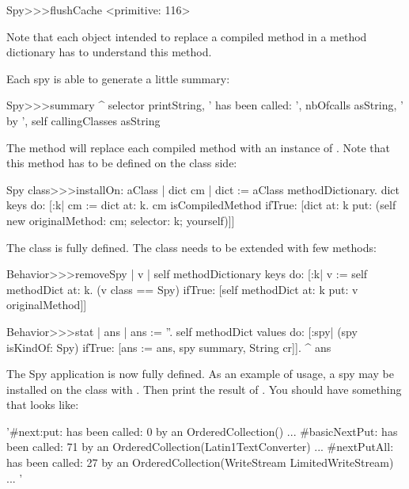 \documentclass[a4paper,10pt,twoside]{book}
\begin{document}
\begin{code}{}
Spy>>>flushCache
	<primitive: 116>
\end{code}

Note that each object intended to replace a compiled method in a method dictionary has to understand this method.

Each spy is able to generate a little summary:

\begin{code}{}
Spy>>>summary
	^ selector printString, ' has been called: ', nbOfcalls asString, ' by ', self callingClasses asString
\end{code}

The  method will replace each compiled method with an instance of . Note that this method has to be defined on the class side:

\begin{code}{}
Spy class>>>installOn: aClass
	| dict cm |
	dict := aClass methodDictionary.
	dict keys do:
		[:k|
			cm := dict at: k.
			cm isCompiledMethod 
			 	ifTrue: [dict at: k put: (self new originalMethod: cm; selector: k; yourself)]]
			
\end{code}

The  class is fully defined. The  class needs to be extended with few methods:

\begin{code}{}
Behavior>>>removeSpy
	| v |
	self methodDictionary keys do:
		[:k|
			v := self methodDict at: k. 
			(v class == Spy)
					ifTrue: [self methodDict at: k put: v originalMethod]]

Behavior>>>stat
	| ans |
	ans := ''.
	self methodDict values do: 
		[:spy|
				(spy isKindOf: Spy)
					ifTrue: [ans := ans, spy summary, String cr]].
	^ ans
\end{code}

The Spy application is now fully defined. As an example of usage, a spy may be installed on the class  with . Then print the result of . You should have something that looks like:

\begin{code}{}
 '#next:put: has been called: 0 by an OrderedCollection()
...
#basicNextPut: has been called: 71 by an OrderedCollection(Latin1TextConverter)
...
#nextPutAll: has been called: 27 by an OrderedCollection(WriteStream LimitedWriteStream)
...
'
\end{code}
\end{document}
